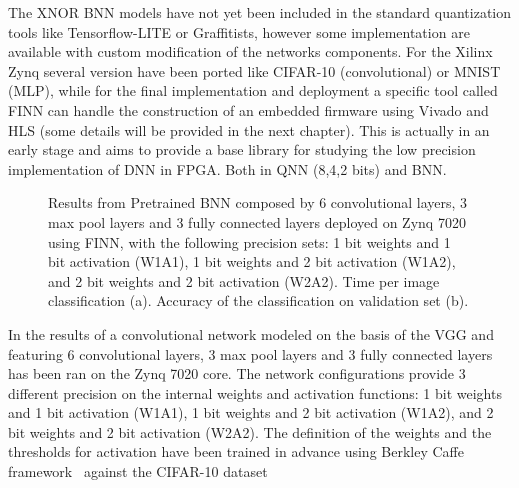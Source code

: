 The XNOR BNN models have not yet been included in the standard quantization tools like Tensorflow-LITE or Graffitists, however some implementation are available with custom modification of the networks components.
For the Xilinx Zynq several version have been ported like CIFAR-10 (convolutional) or MNIST (MLP), while for the final implementation and deployment a specific tool called FINN can handle the construction of an embedded firmware using Vivado and HLS (some details will be provided in the next chapter). This is actually in an early stage and aims to provide a base library for studying the low precision implementation of DNN in FPGA. Both in QNN (8,4,2 bits) and BNN.
%
\begin{figure}
    \centering
    \caption{Results from Pretrained BNN composed by 6 convolutional layers, 3 max pool layers and 3 fully connected layers deployed on Zynq 7020 using FINN, with the following precision sets: 1 bit weights and 1 bit activation (W1A1), 1 bit weights and 2 bit activation (W1A2), and 2 bit weights and 2 bit activation (W2A2). Time per image classification (a). Accuracy of the classification on validation set (b). }
    \label{fig:bnn_zynq}
\end{figure}
%
In \Figure{\ref{fig:bnn_zynq}} the results of a convolutional network modeled on the basis of the VGG and featuring 6 convolutional layers, 3 max pool layers and 3 fully connected layers has been ran on the Zynq 7020 core. The network configurations provide 3 different precision on the internal weights and activation functions: 1 bit weights and 1 bit activation (W1A1), 1 bit weights and 2 bit activation (W1A2), and 2 bit weights and 2 bit activation (W2A2). The definition of the weights and the thresholds for activation have been trained in advance using Berkley Caffe framework~\cite{finn} against the CIFAR-10 dataset~\cite{cifar-10}

